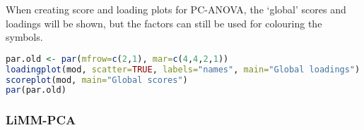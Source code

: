 When creating score and loading plots for PC-ANOVA, the `global' scores
and loadings will be shown, but the factors can still be used for
colouring the symbols.
\begin{lstlisting}[language=R, columns=fullflexible, basicstyle=\linespread{0.85}\small\ttfamily, stringstyle=\color{DarkGreen}, keywordstyle=\color{blue}, commentstyle=\color{DarkGreen},]
par.old <- par(mfrow=c(2,1), mar=c(4,4,2,1))
loadingplot(mod, scatter=TRUE, labels="names", main="Global loadings")
scoreplot(mod, main="Global scores")
par(par.old)
\end{lstlisting}

\subsubsection{LiMM-PCA}\label{limm-pca}

